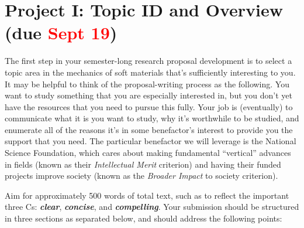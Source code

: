 \section*{Project I: Topic ID and Overview (due \textcolor{red}{Sept 19})}


The first step in your semester-long research proposal development is to select a topic area in the mechanics of soft materials that's sufficiently interesting to you. 
It may be helpful to think of the proposal-writing process as the following. 
You want to study something that you are especially interested in, but you don't yet have the resources that you need to pursue this fully. 
Your job is (eventually) to communicate what it is you want to study, why it's worthwhile to be studied, and enumerate all of the reasons it's in some benefactor's interest to provide you the support that you need.
The particular benefactor we will leverage is the National Science Foundation, which cares about making fundamental ``vertical'' advances in fields (known as their \textit{Intellectual Merit} criterion) and having their funded projects improve society (known as the \textit{Broader Impact} to society criterion). 

Aim for approximately 500 words of total text, such as to reflect the important three Cs: \textbf{\textit{clear}}, \textbf{\textit{concise}}, and \textbf{\textit{compelling}}.
Your submission should be structured in three sections as separated below, and should address the following points: 

